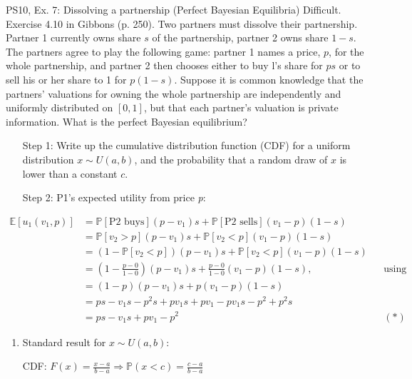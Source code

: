 \begin{frame}{PS10, Ex. 7: Dissolving a partnership (Perfect Bayesian Equilibria)}
    Difficult. Exercise 4.10 in Gibbons (p. 250). Two partners must dissolve their partnership. Partner 1 currently owns share $s$ of the partnership, partner 2 owns share $1-s$. The partners agree to play the following game: partner 1 names a price, $p$, for the whole partnership, and partner 2 then chooses either to buy l's share for $ps$ or to sell his or her share to 1 for $p(1-s)$. Suppose it is common knowledge that the partners' valuations for owning the whole partnership are independently and uniformly distributed on $[0,1]$, but that each partner's valuation is private information. What is the perfect Bayesian equilibrium?\vspace{-11pt}
    \begin{multicols}{2}
      \begin{itemize}
        \item[Step 1:] Write up the cumulative distribution function (CDF) for a uniform distribution $x\sim U(a, b)$, and the probability that a random draw of $x$ is lower than a constant $c$.
        \item[Step 2:] P1's expected utility from price \textit{p}:
      \end{itemize}\vspace{-8pt}
      \begin{align*}
          \mathbb{E}[u_1(v_1,p)]
            &=\mathbb{P}[\text{P2 buys}](p-v_1)s+\mathbb{P}[\text{P2 sells}](v_1-p)(1-s)\\
            &=\mathbb{P}[v_2>p](p-v_1)s+\mathbb{P}[v_2<p](v_1-p)(1-s)\\
            &=(1-\mathbb{P}[v_2<p])(p-v_1)s+\mathbb{P}[v_2<p](v_1-p)(1-s)\\
            &=\left(1-\frac{p-0}{1-0}\right)(p-v_1)s+\frac{p-0}{1-0}(v_1-p)(1-s),&&\text{using the CDF}\\
            &=\left(1-p\right)(p-v_1)s+p(v_1-p)(1-s)\\
            &=ps-v_1s-p^2s+pv_1s+pv_1-pv_1s-p^2+p^2s\\
            &=ps-v_1s+pv_1-p^2%
            &&(*)
      \end{align*}
      \vfill\null\columnbreak
      \begin{enumerate}
        \item Standard result for $x\sim U(a, b):$
        \item[CDF:] $F(x)=\frac{x-a}{b-a}\Rightarrow\mathbb{P}(x<c)=\frac{c-a}{b-a}$
      \end{enumerate}
      \vfill\null
    \end{multicols}
\end{frame}

